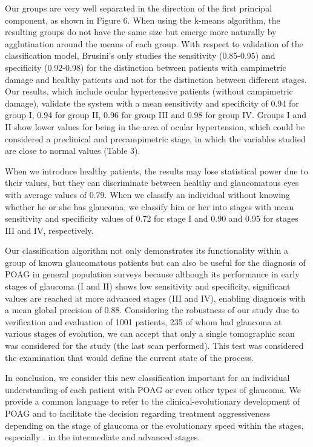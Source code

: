 \documentclass[fleqn,10pt]{wlscirep}
\begin{document}
Our groups are very well separated in the direction of the first principal component, as shown in Figure 6. When using the k-means algorithm, the resulting groups do not have the same size but emerge more naturally by agglutination around the means of each group.
With respect to validation of the classification model, Brusini’s only studies the sensitivity (0.85-0.95) and specificity (0.92-0.98) for the distinction between patients with campimetric damage and healthy patients and not for the distinction between different stages. Our results, which include ocular hypertensive patients (without campimetric damage), validate the system with a mean sensitivity and specificity of 0.94 for group I, 0.94 for group II, 0.96 for group III and 0.98 for group IV. Groups I and II show lower values for being in the area of ocular hypertension, which could be considered a preclinical and precampimetric stage, in which the variables studied are close to normal values (Table 3).

When we introduce healthy patients, the results may lose statistical power due to their values, but they can discriminate between healthy and glaucomatous eyes with average values of 0.79. When we classify an individual without knowing whether he or she has glaucoma, we classify him or her into stages with mean sensitivity and specificity values of 0.72 for stage I and 0.90 and 0.95 for stages III and IV, respectively.

Our classification algorithm not only demonstrates its functionality within a group of known glaucomatous patients but can also be useful for the diagnosis of POAG in general population surveys because although its performance in early stages of glaucoma (I and II) shows low sensitivity and specificity, significant values are reached at more advanced stages (III and IV), enabling diagnosis with a mean global precision of 0.88. 
Considering the robustness of our study due to verification and evaluation of 1001 patients, 235 of whom had glaucoma at various stages of evolution, we can accept that only a single tomographic scan was considered for the study (the last scan performed). This test was considered the examination that would define the current state of the process.

In conclusion, we consider this new classification important for an individual understanding of each patient with POAG or even other types of glaucoma. We provide a common language to refer to the clinical-evolutionary development of POAG and to facilitate the decision regarding treatment aggressiveness depending on the stage of glaucoma or the evolutionary speed within the stages, especially . in the intermediate and advanced stages.
\end{document}
